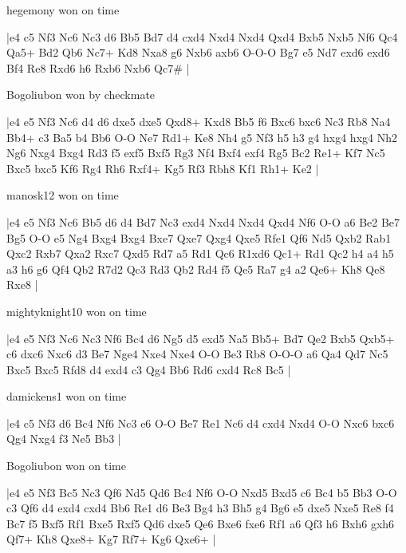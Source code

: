 hegemony won on time

\makegametitle
|e4 c5 Nf3 Nc6 Nc3 d6 Bb5 Bd7 d4 cxd4 Nxd4 Nxd4 Qxd4 Bxb5 Nxb5 Nf6 Qc4 Qa5+ Bd2 Qb6 Nc7+ Kd8 Nxa8 g6 Nxb6 axb6 O-O-O Bg7 e5 Nd7 exd6 exd6 Bf4 Re8 Rxd6 h6 Rxb6 Nxb6 Qc7\#  |

\showboard

Bogoliubon won by checkmate

\makegametitle
|e4 e5 Nf3 Nc6 d4 d6 dxe5 dxe5 Qxd8+ Kxd8 Bb5 f6 Bxc6 bxc6 Nc3 Rb8 Na4 Bb4+ c3 Ba5 b4 Bb6 O-O Ne7 Rd1+ Ke8 Nh4 g5 Nf3 h5 h3 g4 hxg4 hxg4 Nh2 Ng6 Nxg4 Bxg4 Rd3 f5 exf5 Bxf5 Rg3 Nf4 Bxf4 exf4 Rg5 Bc2 Re1+ Kf7 Nc5 Bxc5 bxc5 Kf6 Rg4 Rh6 Rxf4+ Kg5 Rf3 Rbh8 Kf1 Rh1+ Ke2  |

\showboard

manosk12 won on time

\makegametitle
|e4 e5 Nf3 Nc6 Bb5 d6 d4 Bd7 Nc3 exd4 Nxd4 Nxd4 Qxd4 Nf6 O-O a6 Be2 Be7 Bg5 O-O e5 Ng4 Bxg4 Bxg4 Bxe7 Qxe7 Qxg4 Qxe5 Rfe1 Qf6 Nd5 Qxb2 Rab1 Qxc2 Rxb7 Qxa2 Rxc7 Qxd5 Rd7 a5 Rd1 Qc6 R1xd6 Qc1+ Rd1 Qc2 h4 a4 h5 a3 h6 g6 Qf4 Qb2 R7d2 Qc3 Rd3 Qb2 Rd4 f5 Qe5 Ra7 g4 a2 Qe6+ Kh8 Qe8 Rxe8  |

\showboard

mightyknight10 won on time

\makegametitle
|e4 e5 Nf3 Nc6 Nc3 Nf6 Bc4 d6 Ng5 d5 exd5 Na5 Bb5+ Bd7 Qe2 Bxb5 Qxb5+ c6 dxc6 Nxc6 d3 Be7 Nge4 Nxe4 Nxe4 O-O Be3 Rb8 O-O-O a6 Qa4 Qd7 Nc5 Bxc5 Bxc5 Rfd8 d4 exd4 c3 Qg4 Bb6 Rd6 cxd4 Rc8 Bc5  |

\showboard

damickens1 won on time

\makegametitle
|e4 c5 Nf3 d6 Bc4 Nf6 Nc3 e6 O-O Be7 Re1 Nc6 d4 cxd4 Nxd4 O-O Nxc6 bxc6 Qg4 Nxg4 f3 Ne5 Bb3  |

\showboard

Bogoliubon won on time

\makegametitle
|e4 e5 Nf3 Bc5 Nc3 Qf6 Nd5 Qd6 Bc4 Nf6 O-O Nxd5 Bxd5 c6 Bc4 b5 Bb3 O-O c3 Qf6 d4 exd4 cxd4 Bb6 Re1 d6 Be3 Bg4 h3 Bh5 g4 Bg6 e5 dxe5 Nxe5 Re8 f4 Bc7 f5 Bxf5 Rf1 Bxe5 Rxf5 Qd6 dxe5 Qe6 Bxe6 fxe6 Rf1 a6 Qf3 h6 Bxh6 gxh6 Qf7+ Kh8 Qxe8+ Kg7 Rf7+ Kg6 Qxe6+  |


